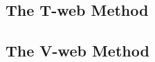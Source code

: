 	\subsection{The T-web Method}
	\label{subsec:TheT-webMethod}


	\subsection{The V-web Method}
	\label{subsec:TheV-webMethod}


